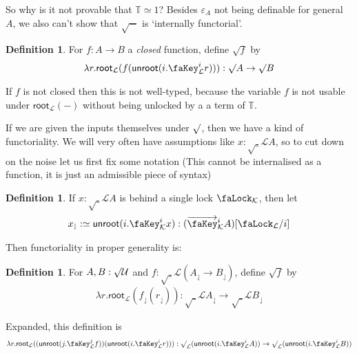\documentclass[10pt]{article}
\theoremstyle{definition}
\newtheorem{definition}[theorem]{Definition}
\let\oldequiv\equiv%
\renewcommand{\equiv}{\simeq}
\newcommand{\defeq}{\oldequiv}
\newcommand*{\univ}{\mathcal{U}}
\newcommand{\lock}{\text{\faLock}}
\newcommand{\key}{\text{\faKey}}
\newcommand{\Tiny}{\mathbb{T}}
\newcommand{\lockn}[1]{\mathcal{#1}}
\newcommand{\varkey}[2]{\key_{\lockn{#1}}^{#2}}
\newcommand{\admkey}[2]{\overrightarrow{\key}_{\lockn{#1}}^{#2}}
\newcommand{\ctxlock}[1]{\lock_{\lockn{#1}}}
\newcommand{\locksub}[2]{\lock_{\lockn{#1}}/#2}
\newcommand{\rform}[2]{\surd_{\lockn{#1}} #2}
\newcommand{\rformu}[1]{\surd #1}
\newcommand{\rintro}[2]{\mathsf{root}_{\lockn{#1}}(#2)}
\newcommand{\relim}[1]{\mathsf{unroot}(#1)}
\newcommand{\rget}[1]{#1_{\downharpoonleft}}
\begin{document}
So why is it not provable that $\Tiny \equiv 1$? Besides $\varepsilon_A$ not being definable for general $A$, we also can't show that $\rformu -$ is `internally functorial'. 

\begin{definition}
For $f : A \to B$ a \emph{closed} function, define $\rformu f$ by 
\begin{align*}
\lambda r. \rintro{L}{f(\relim{i.\varkey{L}{i} r})} : \rformu A \to \rformu B
\end{align*}
\end{definition}
If $f$ is not closed then this is not well-typed, because the variable $f$ is not usable under $\rintro{L}{-}$ without being unlocked by a a term of $\Tiny$. 

If we are given the inputs themselves under $\rformu$, then we have a kind of functoriality. We will very often have assumptions like $x : \rform{L} A$, so to cut down on the noise let us first fix some notation (This cannot be internalised as a function, it is just an admissible piece of syntax)
\begin{definition}
If $x : \rform{L} A$ is behind a single lock $\ctxlock{K}$, then let
\begin{align*}
\rget{x} :\defeq \relim{i.\varkey{K}{i} x} : (\admkey{K}{i}A)[\locksub{L}{i}]
\end{align*}
\end{definition}
Then functoriality in proper generality is:
\begin{definition}
For $A,B : \rformu \univ$ and $f : \rform{L}(\rget{A} \to \rget{B})$, define $\rformu f$ by
\begin{align*}
\lambda r. \rintro{L}{\rget{f}(\rget{r})} : \rform{L}\rget{A} \to \rform{L}\rget{B}
\end{align*}
\end{definition}
Expanded, this definition is
\begin{align*}
\lambda r. \rintro{L}{(\relim{j.\varkey{L}{j} f})(\relim{i.\varkey{L}{i} r})} : \rform{L}(\relim{i.\varkey{L}{i} A}) \to \rform{L}(\relim{i.\varkey{L}{i} B})
\end{align*}
\end{document}
